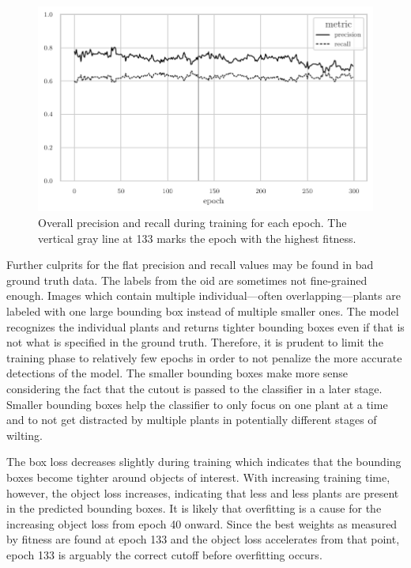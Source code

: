 \documentclass[draft,final]{vutinfth} %
\begin{document}
\begin{figure}
  \centering
  \includegraphics{graphics/precision_recall.pdf}
  \caption[Object detection precision and recall during
  training.]{Overall precision and recall during training for each
    epoch. The vertical gray line at 133 marks the epoch with the
    highest fitness.}
  \label{fig:prec-rec}
\end{figure}

Further culprits for the flat precision and recall values may be found
in bad ground truth data. The labels from the \gls{oid} are sometimes not
fine-grained enough. Images which contain multiple individual—often
overlapping—plants are labeled with one large bounding box instead of
multiple smaller ones. The model recognizes the individual plants and
returns tighter bounding boxes even if that is not what is specified
in the ground truth. Therefore, it is prudent to limit the training
phase to relatively few epochs in order to not penalize the more
accurate detections of the model. The smaller bounding boxes make more
sense considering the fact that the cutout is passed to the classifier
in a later stage. Smaller bounding boxes help the classifier to only
focus on one plant at a time and to not get distracted by multiple
plants in potentially different stages of wilting.

The box loss decreases slightly during training which indicates that
the bounding boxes become tighter around objects of interest. With
increasing training time, however, the object loss increases,
indicating that less and less plants are present in the predicted
bounding boxes. It is likely that overfitting is a cause for the
increasing object loss from epoch \num{40} onward. Since the best
weights as measured by fitness are found at epoch \num{133} and the
object loss accelerates from that point, epoch \num{133} is arguably
the correct cutoff before overfitting occurs.
\end{document}
